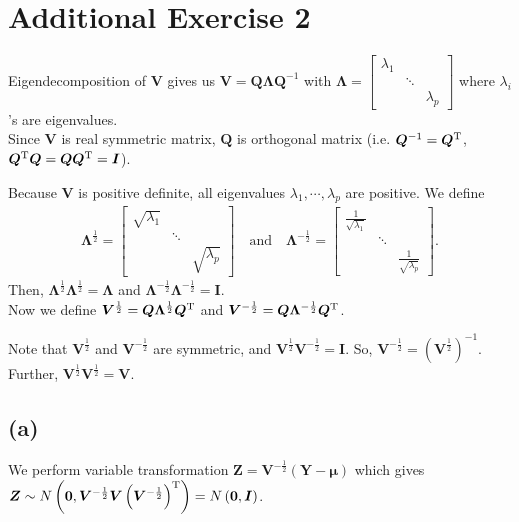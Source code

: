 \section{Additional Exercise 2}
Eigendecomposition of $\bm{V}$ gives us $\bm{V} = \bm{Q}\bm{\Lambda}\bm{Q}^{-1}$ with $\bm{\Lambda} = 
\begin{bmatrix}
\lambda_{1} & &\\
 & \ddots & \\
 &  & \lambda_{p}
\end{bmatrix}$ where $\lambda_{i}$'s are eigenvalues.\\
Since $\bm{V}$ is real symmetric matrix, $\bm{Q}$ is orthogonal matrix (i.e. $\bm{Q}^{-1} = \bm{Q}^{\rm T}$, $\bm{Q}^{\rm T}\bm{Q} = \bm{Q}\bm{Q}^{\rm T} = \bm{I}$).

Because $\bm{V}$ is positive definite, all eigenvalues $\lambda_{1}, \cdots, \lambda_{p}$ are positive. We define
\begin{align*}
\bm{\Lambda}^{\frac{1}{2}} = 
\begin{bmatrix}
\sqrt{\lambda_{1}} & &\\
 & \ddots & \\
 &  & \sqrt{\lambda_{p}}
\end{bmatrix}
\quad \mbox{and} \quad
\bm{\Lambda}^{-\frac{1}{2}} = 
\begin{bmatrix}
\frac{1}{\sqrt{\lambda_{1}}} & &\\
 & \ddots & \\
 &  & \frac{1}{\sqrt{\lambda_{p}}}
\end{bmatrix}.
\end{align*}
Then, $\bm{\Lambda}^{\frac{1}{2}}\bm{\Lambda}^{\frac{1}{2}}  = \bm{\Lambda}$ and $\bm{\Lambda}^{-\frac{1}{2}}\bm{\Lambda}^{-\frac{1}{2}}  = \bm{I}$.\\
Now we define
$\bm{V}^{\frac{1}{2}} = \bm{Q}\bm{\Lambda}^{\frac{1}{2}}\bm{Q}^{\rm T}$ and $\bm{V}^{-\frac{1}{2}} = \bm{Q}\bm{\Lambda}^{-\frac{1}{2}}\bm{Q}^{\rm T}$.


Note that $\bm{V}^{\frac{1}{2}}$ and $\bm{V}^{-\frac{1}{2}}$ are symmetric, and $\bm{V}^{\frac{1}{2}}\bm{V}^{-\frac{1}{2}} = \bm{I}$. So, $\bm{V}^{-\frac{1}{2}} = \left(\bm{V}^{\frac{1}{2}}\right)^{-1}$. Further, $\bm{V}^{\frac{1}{2}}\bm{V}^{\frac{1}{2}} = \bm{V}$.

\subsection*{(a)}
We perform variable transformation $\bm{Z} = \bm{V}^{-\frac{1}{2}}(\bm{Y} - \bm{\mu})$ which gives $\bm{Z} \sim N\left(\bm{0}, \bm{V}^{-\frac{1}{2}}\bm{V}\left(\bm{V}^{-\frac{1}{2}}\right)^{\rm T} \right) = N\left(\bm{0}, \bm{I}\right)$.\\

